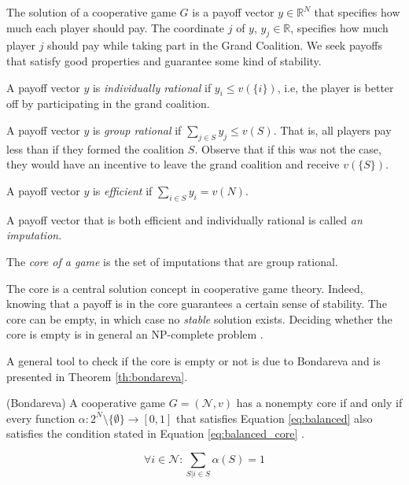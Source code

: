 \documentclass[sigconf, table]{acmart}
\newcommand{\N}{\mathcal{N}}
\begin{document}
The solution of a cooperative game $G$ is a payoff vector $y \in \mathbb{R}^N$ that specifies how much each player should pay. The coordinate $j$ of $y$, $y_j \in \mathbb{R}$, specifies how much player $j$ should pay while taking part in the Grand Coalition. We seek payoffs that satisfy good properties and guarantee some kind of stability.

\begin{definition}\label{def:pg_ir}
  A payoff vector $y$ is {\em individually rational} if $y_i \leq v(\{i\})$, i.e, the player is better off by participating in the grand coalition.
\end{definition}

\begin{definition}\label{def:pf_gr}
  A payoff vector $y$ is {\em group rational} if $\sum_{j \in S} y_j \leq v(S)$. That is, all players pay less than if they formed the coalition $S$. Observe that if this was not the case, they would have an incentive to leave the grand coalition and receive $v(\{S\})$.
\end{definition}

\begin{definition}\label{def:pf_eff}
 A payoff vector $y$ is {\em efficient} if $\sum_{i \in S} y_i = v(N)$.
\end{definition}

\begin{definition}\label{def:imputation}
  A payoff vector that is both efficient and individually rational is called {\em an imputation}.
\end{definition}

\begin{definition}\label{def:core}
  The {\em core of a game} is the set of imputations that are group rational.
\end{definition}

The core is a central solution concept in cooperative game theory. Indeed, knowing that a payoff is in the core guarantees a certain sense of stability.
The core can be empty, in which case no \textit{stable} solution exists. Deciding whether the core is empty is in general an NP-complete problem \cite{deng1994complexity}.

A general tool to check if the core is empty or not is due to Bondareva and is presented in Theorem \ref{th:bondareva}.

\begin{theorem}\label{th:bondareva}
 (Bondareva) A cooperative game $G = (\N, v)$ has a nonempty core if and only if every function $\alpha \colon 2^N \setminus \{\emptyset\} \to [0, 1]$ that satisfies Equation \eqref{eq:balanced} also satisfies the condition stated in Equation \eqref{eq:balanced_core} \cite{bondareva}.

\begin{equation}
\label{eq:balanced}
\forall i \in \N \colon \sum_{S|i \in S} \alpha(S) = 1
\end{equation}
\end{theorem}
\end{document}
